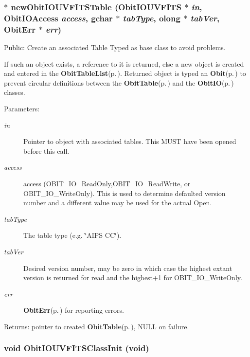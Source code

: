 \subsubsection{$\ast$ new\-Obit\-IOUVFITSTable ({\bf Obit\-IOUVFITS} $\ast$ {\em in}, Obit\-IOAccess {\em access}, gchar $\ast$ {\em tab\-Type}, {\bf olong} $\ast$ {\em tab\-Ver}, {\bf Obit\-Err} $\ast$ {\em err})}\label{ObitIOUVFITS_8h_a24}


Public: Create an associated Table Typed as base class to avoid problems. 

If such an object exists, a reference to it is returned, else a new object is created and entered in the {\bf Obit\-Table\-List}{\rm (p.\,\pageref{structObitTableList})}. Returned object is typed an {\bf Obit}{\rm (p.\,\pageref{structObit})} to prevent circular definitions between the {\bf Obit\-Table}{\rm (p.\,\pageref{structObitTable})} and the {\bf Obit\-IO}{\rm (p.\,\pageref{structObitIO})} classes. \begin{Desc}
\item[Parameters:]
\begin{description}
\item[{\em in}]Pointer to object with associated tables. This MUST have been opened before this call. \item[{\em access}]access (OBIT\_\-IO\_\-Read\-Only,OBIT\_\-IO\_\-Read\-Write, or OBIT\_\-IO\_\-Write\-Only). This is used to determine defaulted version number and a different value may be used for the actual Open. \item[{\em tab\-Type}]The table type (e.g. \char`\"{}AIPS CC\char`\"{}). \item[{\em tab\-Ver}]Desired version number, may be zero in which case the highest extant version is returned for read and the highest+1 for OBIT\_\-IO\_\-Write\-Only. \item[{\em err}]{\bf Obit\-Err}{\rm (p.\,\pageref{structObitErr})} for reporting errors. \end{description}
\end{Desc}
\begin{Desc}
\item[Returns:]pointer to created {\bf Obit\-Table}{\rm (p.\,\pageref{structObitTable})}, NULL on failure. \end{Desc}
\subsubsection{\setlength{\rightskip}{0pt plus 5cm}void Obit\-IOUVFITSClass\-Init (void)}\label{ObitIOUVFITS_8h_a3}


